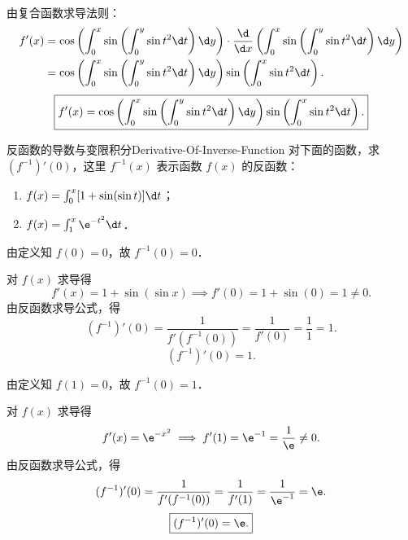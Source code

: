 \begin{solution}

    由复合函数求导法则：
    \begin{equation}
        \begin{aligned}
            f'(x) & = \cos\left( \int_0^x \sin\left( \int_0^y \sin t^2 \d t \right) \d y \right) \cdot \frac{\d}{\d x}\left( \int_0^x \sin\left( \int_0^y \sin t^2 \d t \right) \d y \right) \\
                  & = \cos\left( \int_0^x \sin\left( \int_0^y \sin t^2 \d t \right) \d y \right) \sin\left( \int_0^x \sin t^2 \d t \right).
        \end{aligned}
    \end{equation}
    \begin{equation}
        \boxed{f'(x) = \cos\left( \int_0^x \sin\left( \int_0^y \sin t^2 \d t \right) \d y \right) \sin\left( \int_0^x \sin t^2 \d t \right).}
    \end{equation}
\end{solution}

\begin{problem}{反函数的导数与变限积分}{Derivative-Of-Inverse-Function}
    对下面的函数，求 $(f^{-1})'(0)$，这里 $f^{-1}(x)$ 表示函数 $f(x)$ 的反函数：
    \begin{enumerate}
        \item $f(x) = \int_0^x [1 + \sin(\sin t)] \d t$；
        \item $f(x) = \int_1^x \e^{-t^2} \d t$．
    \end{enumerate}
\end{problem}

\begin{solution}

    由定义知 $f(0) = 0$，故 $f^{-1}(0) = 0$．

    对 $f(x)$ 求导得
    \begin{equation}
        f'(x) = 1 + \sin(\sin x) \implies f'(0) = 1 + \sin(0) = 1 \neq 0.
    \end{equation}
    由反函数求导公式，得
    \begin{equation}
        (f^{-1})'(0) = \frac{1}{f'(f^{-1}(0))} = \frac{1}{f'(0)} = \frac{1}{1} = 1.
    \end{equation}
    \begin{equation}
        \boxed{(f^{-1})'(0) = 1.}
    \end{equation}


    由定义知 $f(1) = 0$，故 $f^{-1}(0) = 1$．

    对 $f(x)$ 求导得
    \begin{equation}
        f'(x) = \e^{-x^2} \implies f'(1) = \e^{-1} = \frac{1}{\e} \neq 0.
    \end{equation}
    由反函数求导公式，得
    \begin{equation}
        (f^{-1})'(0) = \frac{1}{f'(f^{-1}(0))} = \frac{1}{f'(1)} = \frac{1}{\e^{-1}} = \e.
    \end{equation}
    \begin{equation}
        \boxed{(f^{-1})'(0) = \e.}
    \end{equation}
\end{solution}

